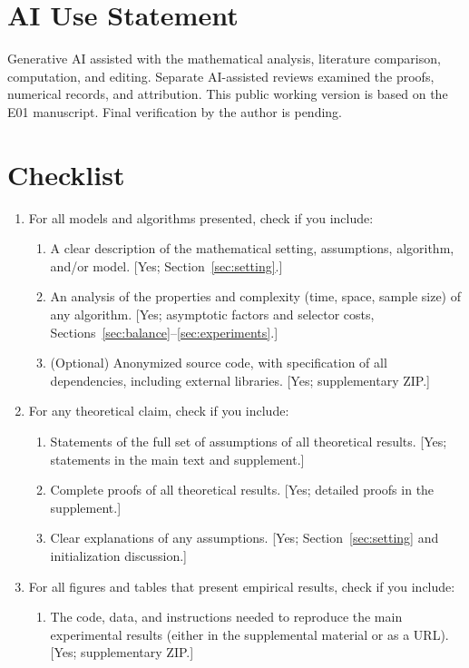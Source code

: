 \documentclass[letterpaper,twoside]{article}
\begin{document}
\clearpage
\section*{AI Use Statement}
Generative AI assisted with the mathematical analysis, literature comparison, computation, and editing. Separate AI-assisted reviews examined the proofs, numerical records, and attribution. This public working version is based on the E01 manuscript. Final verification by the author is pending.



\section*{Checklist}
\begin{enumerate}
\item For all models and algorithms presented, check if you include:
\begin{enumerate}
\item A clear description of the mathematical setting, assumptions, algorithm, and/or model. [Yes; Section~\ref{sec:setting}.]
\item An analysis of the properties and complexity (time, space, sample size) of any algorithm. [Yes; asymptotic factors and selector costs, Sections~\ref{sec:balance}--\ref{sec:experiments}.]
\item (Optional) Anonymized source code, with specification of all dependencies, including external libraries. [Yes; supplementary ZIP.]
\end{enumerate}
\item For any theoretical claim, check if you include:
\begin{enumerate}
\item Statements of the full set of assumptions of all theoretical results. [Yes; statements in the main text and supplement.]
\item Complete proofs of all theoretical results. [Yes; detailed proofs in the supplement.]
\item Clear explanations of any assumptions. [Yes; Section~\ref{sec:setting} and initialization discussion.]
\end{enumerate}
\item For all figures and tables that present empirical results, check if you include:
\begin{enumerate}
\item The code, data, and instructions needed to reproduce the main experimental results (either in the supplemental material or as a URL). [Yes; supplementary ZIP.]

\end{enumerate}
\end{enumerate}
\end{document}
